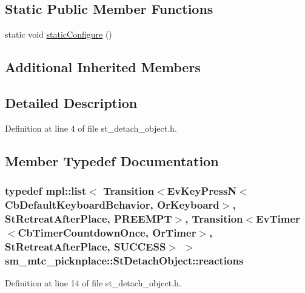 \subsection*{Static Public Member Functions}
\begin{DoxyCompactItemize}
\item 
static void \hyperlink{structsm__mtc__picknplace_1_1StDetachObject_ace50c7d119025cf3b78a95e9fba91e4e}{static\+Configure} ()
\end{DoxyCompactItemize}
\subsection*{Additional Inherited Members}


\subsection{Detailed Description}


Definition at line 4 of file st\+\_\+detach\+\_\+object.\+h.



\subsection{Member Typedef Documentation}
\subsubsection[{\texorpdfstring{reactions}{reactions}}]{\setlength{\rightskip}{0pt plus 5cm}typedef mpl\+::list$<$ Transition$<$Ev\+Key\+PressN$<$Cb\+Default\+Keyboard\+Behavior, {\bf Or\+Keyboard}$>$, {\bf St\+Retreat\+After\+Place}, {\bf P\+R\+E\+E\+M\+PT}$>$, Transition$<$Ev\+Timer$<$Cb\+Timer\+Countdown\+Once, {\bf Or\+Timer}$>$, {\bf St\+Retreat\+After\+Place}, {\bf S\+U\+C\+C\+E\+SS}$>$ $>$ {\bf sm\+\_\+mtc\+\_\+picknplace\+::\+St\+Detach\+Object\+::reactions}}\hypertarget{structsm__mtc__picknplace_1_1StDetachObject_a2d9f1674c4132c677c50092a19c67b1e}{}\label{structsm__mtc__picknplace_1_1StDetachObject_a2d9f1674c4132c677c50092a19c67b1e}


Definition at line 14 of file st\+\_\+detach\+\_\+object.\+h.



